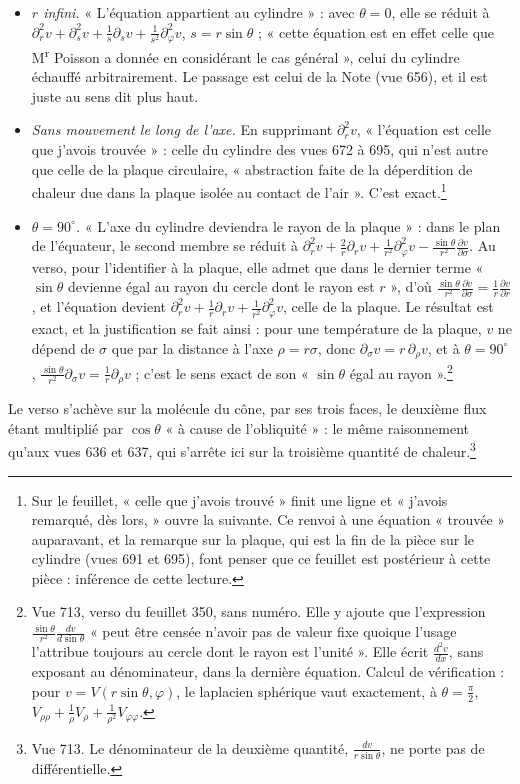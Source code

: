 \documentclass[11pt,a4paper]{article}
\begin{document}
\begin{itemize}
\item \emph{$r$ infini.} « L'équation appartient au cylindre » : avec $\theta =
0$, elle se réduit à $\partial_r^2 v + \partial_s^2 v + \frac1s\partial_s v +
\frac{1}{s^2}\partial_\varphi^2 v$, $s = r\sin\theta$ ; « cette équation est en
effet celle que M\textsuperscript{r} Poisson a donnée en considérant le cas
général », celui du cylindre échauffé arbitrairement. Le passage est celui de
la Note (vue 656), et il est juste au sens dit plus haut.
\item \emph{Sans mouvement le long de l'axe.} En supprimant $\partial_r^2 v$,
« l'équation est celle que j'avois trouvée » : celle du cylindre des vues 672 à
695, qui n'est autre que celle de la plaque circulaire, « abstraction faite de
la déperdition de chaleur due dans la plaque isolée au contact de l'air ».
C'est exact.\footnote{Sur le feuillet, « celle que j'avois trouvé » finit une
ligne et « j'avois remarqué, dès lors, » ouvre la suivante. Ce renvoi à une
équation « trouvée » auparavant, et la remarque sur la plaque, qui est la fin de
la pièce sur le cylindre (vues 691 et 695), font penser que ce feuillet est
postérieur à cette pièce : inférence de cette lecture.}
\item \emph{$\theta = 90^\circ$.} « L'axe du cylindre deviendra le rayon de la
plaque » : dans le plan de l'équateur, le second membre se réduit à
$\partial_r^2 v + \frac2r\partial_r v + \frac{1}{r^2}\partial_\varphi^2 v -
\frac{\sin\theta}{r^2}\frac{\partial v}{\partial\sigma}$. Au verso, pour
l'identifier à la plaque, elle admet que dans le dernier terme « $\sin\theta$
devienne égal au rayon du cercle dont le rayon est $r$ », d'où
$\frac{\sin\theta}{r^2}\frac{\partial v}{\partial\sigma} = \frac1r
\frac{\partial v}{\partial r}$, et l'équation devient $\partial_r^2 v +
\frac1r\partial_r v + \frac{1}{r^2}\partial_\varphi^2 v$, celle de la plaque.
Le résultat est exact, et la justification se fait ainsi : pour une température
de la plaque, $v$ ne dépend de $\sigma$ que par la distance à l'axe $\rho =
r\sigma$, donc $\partial_\sigma v = r\,\partial_\rho v$, et à $\theta =
90^\circ$, $\frac{\sin\theta}{r^2}\partial_\sigma v = \frac1r\partial_\rho v$
; c'est le sens exact de son « $\sin\theta$ égal au rayon ».\footnote{Vue 713,
verso du feuillet 350, sans numéro. Elle y ajoute que l'expression
$\frac{\sin\theta}{r^2}\frac{dv}{d\sin\theta}$ « peut être censée n'avoir pas
de valeur fixe quoique l'usage l'attribue toujours au cercle dont le rayon est
l'unité ». Elle écrit $\frac{d^2v}{dx}$, sans exposant au dénominateur, dans la
dernière équation. Calcul de vérification : pour $v = V(r\sin\theta, \varphi)$,
le laplacien sphérique vaut exactement, à $\theta = \frac\pi2$,
$V_{\rho\rho} + \frac1\rho V_\rho + \frac{1}{\rho^2}V_{\varphi\varphi}$.}
\end{itemize}
Le verso s'achève sur la molécule du cône, par ses trois faces, le deuxième
flux étant multiplié par $\cos\theta$ « à cause de l'obliquité » : le même
raisonnement qu'aux vues 636 et 637, qui s'arrête ici sur la troisième quantité
de chaleur.\footnote{Vue 713. Le dénominateur de la deuxième quantité,
$\frac{dv}{r\sin\theta}$, ne porte pas de différentielle.}
\end{document}
